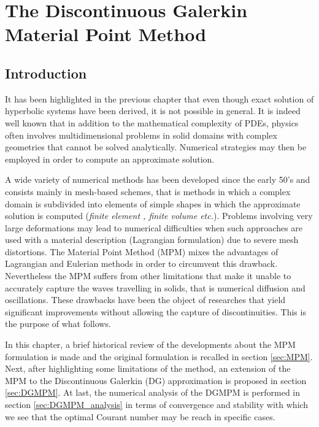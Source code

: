 \chapter{The Discontinuous Galerkin Material Point Method}

\section*{Introduction}
It has been highlighted in the previous chapter that even though exact solution of hyperbolic systems have been derived, it is not possible in general. It is indeed well known that in addition to the mathematical complexity of PDEs, physics often involves multidimensional problems in solid domains with complex geometries that cannot be solved analytically. Numerical strategies may then be employed in order to compute an approximate solution.

A wide variety of numerical methods has been developed since the early 50's and consists mainly in mesh-based schemes, that is methods in which a complex domain is subdivided into elements of simple
shapes in which the approximate solution is computed (\textit{finite element \cite{Belytschko}, finite volume \cite{Leveque} etc.}). Problems involving very large deformations may lead to numerical difficulties when such approaches are used with a material description (Lagrangian formulation) due to severe mesh distortions. The Material Point Method (MPM) \cite{Sulsky94} mixes the advantages of Lagrangian and Eulerian methods in order to circumvent this drawback. Nevertheless the MPM suffers from other limitations that make it unable to accurately capture the waves travelling in solids, that is numerical diffusion and oscillations. These drawbacks have been the object of researches that yield significant improvements without allowing the capture of discontinuities. This is the purpose of what follows.

In this chapter, a brief historical review of the developments about the MPM formulation is made and the original formulation is recalled in section \ref{sec:MPM}. Next, after highlighting some limitations of the method, an extension of the MPM to the Discontinuous Galerkin (DG) approximation is proposed in section \ref{sec:DGMPM}. At last, the numerical analysis of the DGMPM is performed in section \ref{sec:DGMPM_analysis} in terms of convergence and stability with which we see that the optimal Courant number may be reach in specific cases.



